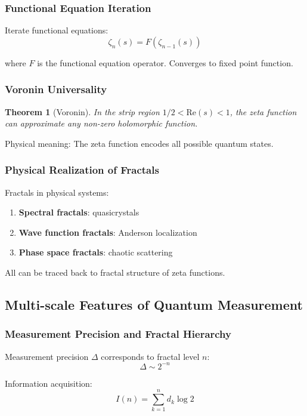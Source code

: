 \documentclass[11pt]{article}
\theoremstyle{plain}
\newtheorem{theorem}{Theorem}[section]
\theoremstyle{definition}
\theoremstyle{remark}
\begin{document}
\subsubsection{Functional Equation Iteration}

Iterate functional equations:
$$\zeta_n(s) = F(\zeta_{n-1}(s))$$

where $F$ is the functional equation operator. Converges to fixed point function.

\subsubsection{Voronin Universality}

\begin{theorem}[Voronin]
In the strip region $1/2 < \text{Re}(s) < 1$, the zeta function can approximate any non-zero holomorphic function.
\end{theorem}

Physical meaning: The zeta function encodes all possible quantum states.

\subsubsection{Physical Realization of Fractals}

Fractals in physical systems:
\begin{enumerate}
\item \textbf{Spectral fractals}: quasicrystals
\item \textbf{Wave function fractals}: Anderson localization
\item \textbf{Phase space fractals}: chaotic scattering
\end{enumerate}

All can be traced back to fractal structure of zeta functions.

\subsection{Multi-scale Features of Quantum Measurement}

\subsubsection{Measurement Precision and Fractal Hierarchy}

Measurement precision $\Delta$ corresponds to fractal level $n$:
$$\Delta \sim 2^{-n}$$

Information acquisition:
$$I(n) = \sum_{k=1}^{n} d_k \log 2$$
\end{document}
